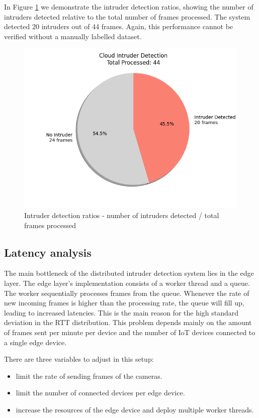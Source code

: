 \documentclass[conference]{IEEEtran}
\begin{document}
In Figure \ref{fig:intruder_ratios} we demonstrate the intruder detection ratios, showing the number of intruders detected relative to the total number of frames processed. The system detected 20 intruders out of 44 frames. Again, this performance cannot be verified without a manually labelled dataset. 


\begin{figure}[!h]
    \centering
    \includegraphics[width=1\linewidth]{./res/evaluation_with_latencies/intruder_ratios.png}
    \caption{Intruder detection ratios - number of intruders detected / total frames processed}
    
    \label{fig:intruder_ratios}
\end{figure}


\subsection{Latency analysis}
\label{sec:latency_analysis}
The main bottleneck of the distributed intruder detection system lies in the edge layer. The edge layer's implementation consists of a worker thread and a queue. The worker sequentially processes frames from the queue. Whenever the rate of new incoming frames is higher than the processing rate, the queue will fill up, leading to increased latencies. This is the main reason for the high standard deviation in the RTT distribution. This problem depends mainly on the amount of frames sent per minute per device and the number of IoT devices connected to a single edge device. 


There are three variables to adjust in this setup: 
\begin{itemize}
    \item limit the rate of sending frames of the cameras.
    \item limit the number of connected devices per edge device.
    \item increase the resources of the edge device and deploy multiple worker threads.
\end{itemize}
\end{document}
